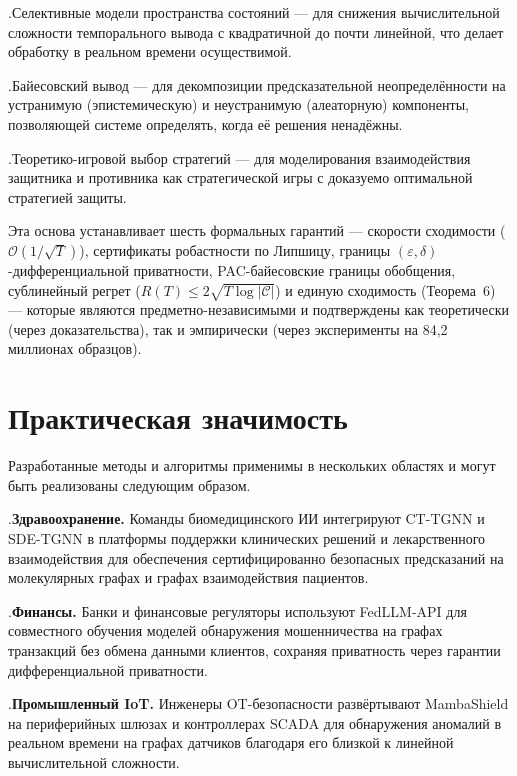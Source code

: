 .\quad Селективные модели пространства состояний --- для снижения вычислительной сложности темпорального вывода с квадратичной до почти линейной, что делает обработку в реальном времени осуществимой.

.\quad Байесовский вывод --- для декомпозиции предсказательной неопределённости на устранимую (эпистемическую) и неустранимую (алеаторную) компоненты, позволяющей системе определять, когда её решения ненадёжны.

.\quad Теоретико-игровой выбор стратегий --- для моделирования взаимодействия защитника и противника как стратегической игры с доказуемо оптимальной стратегией защиты.

Эта основа устанавливает шесть формальных гарантий --- скорости сходимости ($\mathcal{O}(1/\sqrt{T})$), сертификаты робастности по Липшицу, границы $(\varepsilon,\delta)$-дифференциальной приватности, PAC-байесовские границы обобщения, сублинейный регрет ($R(T)\leq 2\sqrt{T\log|\mathcal{C}|}$) и единую сходимость (Теорема~6) --- которые являются предметно-независимыми и подтверждены как теоретически (через доказательства), так и эмпирически (через эксперименты на 84,2 миллионах образцов).


\section*{Практическая значимость}

Разработанные методы и алгоритмы применимы в нескольких областях и могут быть реализованы следующим образом.

.\quad \textbf{Здравоохранение.} Команды биомедицинского ИИ интегрируют CT-TGNN и SDE-TGNN в платформы поддержки клинических решений и лекарственного взаимодействия для обеспечения сертифицированно безопасных предсказаний на молекулярных графах и графах взаимодействия пациентов.

.\quad \textbf{Финансы.} Банки и финансовые регуляторы используют FedLLM-API для совместного обучения моделей обнаружения мошенничества на графах транзакций без обмена данными клиентов, сохраняя приватность через гарантии дифференциальной приватности.

.\quad \textbf{Промышленный IoT.} Инженеры OT-безопасности развёртывают MambaShield на периферийных шлюзах и контроллерах SCADA для обнаружения аномалий в реальном времени на графах датчиков благодаря его близкой к линейной вычислительной сложности.

